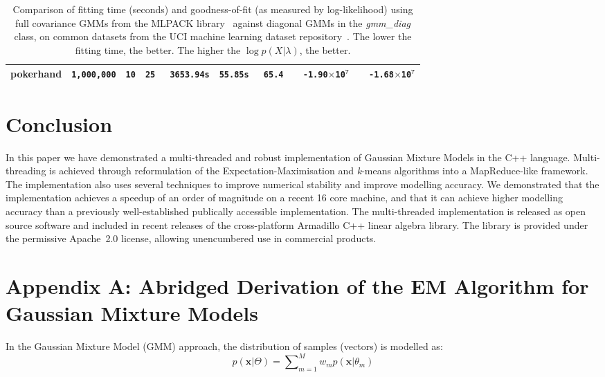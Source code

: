 \documentclass[10pt,a4paper]{article}
\def\Vec#1{{\boldsymbol{#1}}}
\begin{document}
\begin{table}[!tb]
\begin{tabular}{|l|c|c|c|c|c|c|c|c|}
  pokerhand   & {\tt 1,000,000} & {\tt 10} & {\tt 25} & {\tt ~3653.94s} &  {\tt\bfseries 55.85s} & {\tt ~65.4} & {\tt~~-1.90{\tiny$\times$}10$^{\mathtt 7}$} & {\tt\bfseries ~~-1.68{\tiny$\times$}10$^{\mathtt 7}$} \\
\hline
\end{tabular}
\vspace{1ex}
\caption
  {
  Comparison of fitting time (seconds) and goodness-of-fit (as measured by log-likelihood) using full covariance GMMs from the MLPACK library~\cite{Curtin_2013}
  against diagonal GMMs in the {\it gmm\_diag} class,
  on common datasets from the UCI machine learning dataset repository~\cite{Lichman_2013}.
  The lower the fitting time, the better.
  The higher the $\log p(X|\lambda)$, the better.
  }
\label{tab:results}
\end{table}



\section{Conclusion}

In this paper we have demonstrated a multi-threaded and robust implementation
of Gaussian Mixture Models in the C++ language.
Multi-threading is achieved through reformulation of the Expectation-Maximisation and {\it k}-means algorithms into a MapReduce-like framework.
The implementation also uses several techniques to improve numerical stability and improve modelling accuracy.
We demonstrated that the implementation achieves a speedup of an order of magnitude on a recent 16 core machine,
and that it can achieve higher modelling accuracy than a previously well-established publically accessible implementation.
The multi-threaded implementation is released as open source software
and included in recent releases of the cross-platform Armadillo C++ linear algebra library.
The library is provided under the permissive Apache~2.0 license, allowing unencumbered use in commercial products.



\appendix
\section*{Appendix A: Abridged Derivation of the EM Algorithm for Gaussian Mixture Models}
\label{app:em_algorithm}

In the Gaussian Mixture Model (GMM) approach, the distribution of samples (vectors) is modelled as:
%
\begin{equation}
	p(\Vec{x} | \Theta) = \sum\nolimits_{m=1}^{M} w_m p(\Vec{x}| \theta_m)
	\label{eqn:mixture_fn}
\end{equation}
\end{document}
